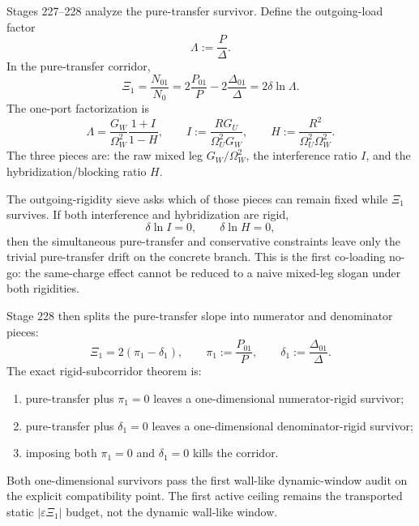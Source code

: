 Stages 227--228 analyze the pure-transfer survivor.  Define the outgoing-load factor
\begin{equation}
\label{eq:app-part07-load-factor-lambda}
\Lambda:=\frac{P}{\Delta}.
\end{equation}
In the pure-transfer corridor,
\begin{equation}
\label{eq:app-part07-xi-lambda}
\Xi_1=\frac{N_{01}}{N_0}=2\frac{P_{01}}{P}-2\frac{\Delta_{01}}{\Delta}=2\delta\ln\Lambda.
\end{equation}
The one-port factorization is
\begin{equation}
\label{eq:app-part07-lambda-factorization}
\Lambda
=
\frac{G_W}{\Omega_W^2}\frac{1+I}{1-H},
\qquad
I:=\frac{RG_U}{\Omega_U^2G_W},
\qquad
H:=\frac{R^2}{\Omega_U^2\Omega_W^2}.
\end{equation}
The three pieces are: the raw mixed leg \(G_W/\Omega_W^2\), the interference ratio \(I\), and the hybridization/blocking ratio \(H\).

The outgoing-rigidity sieve asks which of those pieces can remain fixed while \(\Xi_1\) survives.  If both interference and hybridization are rigid,
\begin{equation}
\label{eq:app-part07-co-loading-no-go-hypothesis}
\delta\ln I=0,
\qquad
\delta\ln H=0,
\end{equation}
then the simultaneous pure-transfer and conservative constraints leave only the trivial pure-transfer drift on the concrete branch.  This is the first co-loading no-go: the same-charge effect cannot be reduced to a naive mixed-leg slogan under both rigidities.

Stage 228 then splits the pure-transfer slope into numerator and denominator pieces:
\begin{equation}
\label{eq:app-part07-numerator-denominator-split}
\Xi_1=2(\pi_1-\delta_1),
\qquad
\pi_1:=\frac{P_{01}}{P},
\qquad
\delta_1:=\frac{\Delta_{01}}{\Delta}.
\end{equation}
The exact rigid-subcorridor theorem is:
\begin{enumerate}[leftmargin=2.2em]
  \item pure-transfer plus \(\pi_1=0\) leaves a one-dimensional numerator-rigid survivor;
  \item pure-transfer plus \(\delta_1=0\) leaves a one-dimensional denominator-rigid survivor;
  \item imposing both \(\pi_1=0\) and \(\delta_1=0\) kills the corridor.
\end{enumerate}
Both one-dimensional survivors pass the first wall-like dynamic-window audit on the explicit compatibility point.  The first active ceiling remains the transported static \(|\varepsilon\Xi_1|\) budget, not the dynamic wall-like window.

